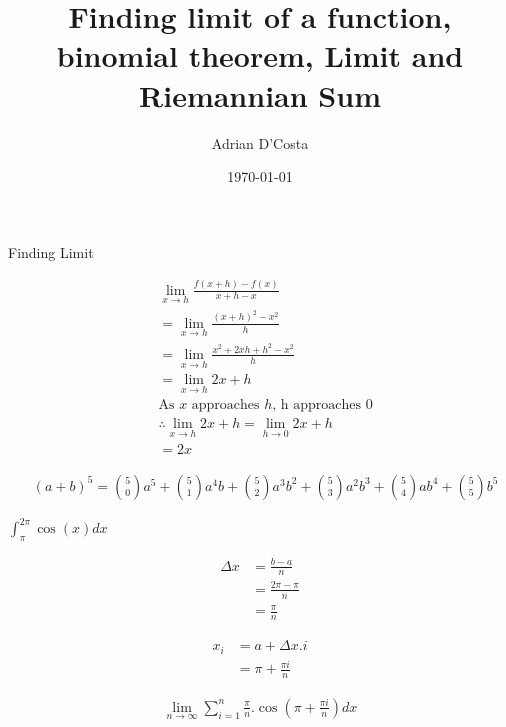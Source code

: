 \documentclass[12pt]{article}
\title{Finding limit of a function, binomial theorem, Limit and Riemannian Sum}
\author{Adrian D'Costa}
\date{\today}
\begin{document}
\maketitle

Finding Limit

\begin{align*}
&\lim_{x \to h}\frac{f(x + h) - f(x)}{x+h-x}\\
&=\lim_{x \to h}\frac{(x+h)^{2} - x^{2}}{h}\\
&=\lim_{x \to h}\frac{x^{2} + 2xh + h^{2} - x^{2}}{h}\\
&=\lim_{x \to h}2x + h\\
&\text{As }x\text{ approaches }h \text{, h approaches }0\\
&\therefore \lim_{x \to h}2x + h = \lim_{h \to 0}2x + h\\
&=2x
\end{align*}


\begin{align*}
&(a+b)^{5} = \binom{5}{0}a^{5} + \binom{5}{1}a^{4}b + \binom{5}{2}a^{3}b^{2} + \binom{5}{3}a^{2}b^{3} + \binom{5}{4}ab^{4} + \binom{5}{5}b^{5}
\end{align*}
\newline


\maketitle
\newline

$\displaystyle \int_{\pi}^{2\pi}\cos(x)dx  $

\begin{align*}\displaystyle \Delta x &= \frac{b -a}{n}\\ &= \frac{2\pi - \pi}{n}\\
&= \frac{\pi}{n}
\end{align*}


\begin{align*}x_{i} &= a + \Delta x . i\\
&= \pi + \frac{\pi i}{n}
\end{align*}


\begin{align*}
\lim_{n \to \infty} \sum_{i = 1}^{n} \frac{\pi}{n} . \cos(\pi + \frac{\pi i}{n})dx
\end{align*}
\end{document}
